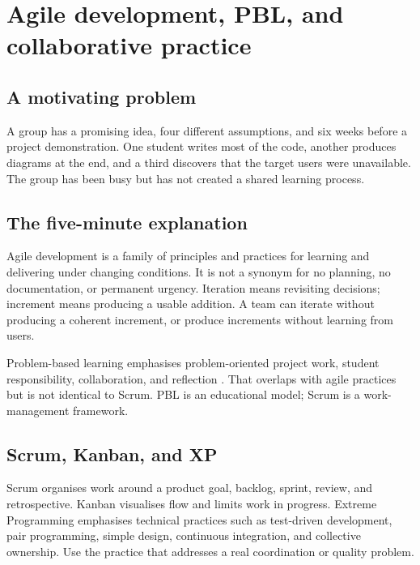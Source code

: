 \chapter{Agile development, PBL, and collaborative practice}
\label{ch:agile-pbl}

\section{A motivating problem}
A group has a promising idea, four different assumptions, and six weeks before a project demonstration. One student writes most of the code, another produces diagrams at the end, and a third discovers that the target users were unavailable. The group has been busy but has not created a shared learning process.


\section{The five-minute explanation}
Agile development is a family of principles and practices for learning and delivering under changing conditions. It is not a synonym for no planning, no documentation, or permanent urgency. Iteration means revisiting decisions; increment means producing a usable addition. A team can iterate without producing a coherent increment, or produce increments without learning from users.

Problem-based learning emphasises problem-oriented project work, student responsibility, collaboration, and reflection \citep{kolmos2007process}. That overlaps with agile practices but is not identical to Scrum. PBL is an educational model; Scrum is a work-management framework.

\section{Scrum, Kanban, and XP}
Scrum organises work around a product goal, backlog, sprint, review, and retrospective. Kanban visualises flow and limits work in progress. Extreme Programming emphasises technical practices such as test-driven development, pair programming, simple design, continuous integration, and collective ownership. Use the practice that addresses a real coordination or quality problem.

